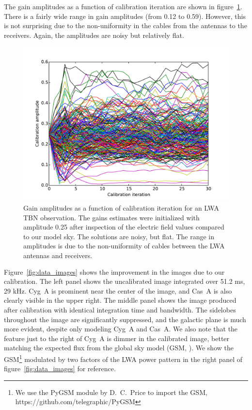 \documentclass[a4paper,fleqn,usenatbib]{mnras}
\begin{document}
The gain amplitudes as a function of calibration iteration are shown in figure~\ref{fig:data_amp}. There is a fairly wide range in gain amplitudes (from 0.12 to 0.59). However, this is not surprising due to the non-uniformity in the cables from the antennas to the receivers. Again, the amplitudes are noisy but relatively flat.

\begin{figure}
\begin{center}
\includegraphics[width=\columnwidth]{cal_paper_data_amps.pdf}
\caption{Gain amplitudes as a function of calibration iteration for an LWA TBN observation. The gains estimates were initialized with amplitude 0.25 after inspection of the electric field values compared to our model sky. The solutions are noisy, but flat. The range in amplitudes is due to the non-uniformity of cables between the LWA antennas and receivers.
}
\label{fig:data_amp}
\end{center}
\end{figure}

Figure~\ref{fig:data_images} shows the improvement in the images due to our calibration. The left panel shows the uncalibrated image integrated over 51.2 ms, 29 kHz. Cyg~A is prominent near the center of the image, and Cas~A is also clearly visible in the upper right. The middle panel shows the image produced after calibration with identical integration time and bandwidth. The sidelobes throughout the image are significantly suppressed, and the galactic plane is much more evident, despite only modeling Cyg~A and Cas~A. We also note that the feature just to the right of Cyg~A is dimmer in the calibrated image, better matching the expected flux from the global sky model (GSM, \citealt{deo08}). We show the GSM\footnote{We use the PyGSM module by D.~C.~Price to import the GSM, https://github.com/telegraphic/PyGSM} modulated by two factors of the LWA power pattern in the right panel of figure~\ref{fig:data_images} for reference.
\end{document}
